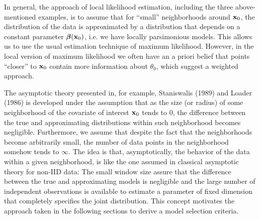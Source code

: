 In general, the approach of local likelihood estimation, including the
three above-mentioned examples, is to assume that 
for ``small'' neighborhoods around ${\mathbf x}_0$, the distribution of
the data is approximated by a distribution that depends on a constant
parameter $\mbox{\boldmath $\beta$\unboldmath}({\mathbf x}_0)$, i.e. we have locally parsimonious models. This
allows us to  
use the usual estimation technique of maximum likelihood. However, in
the local version of maximum likelihood we often
have an a priori belief that points  
``closer'' to ${\mathbf x}_0$ contain more information about
$\theta_0$, which suggest a weighted approach. 

The asymptotic theory presented in, for example,  Staniswalis (1989)
\nocite{stan:1989} and 
Loader (1986) \nocite{load:1996} is developed under the assumption that 
as the size (or radius) of some neighborhood of the covariate of
interest ${\mathbf x}_0$ tends to 0, the difference between the true and
approximating distributions within such neighborhood becomes
negligible. Furthermore, we assume that despite the fact that the
neighborhoods become arbitrarily small, the
number of data points in the neighborhood somehow tends to $\infty$. 
The idea is that, asymptotically, the behavior of the
data within a given neighborhood, is like the  one assumed in
classical asymptotic theory for non-IID data: The small window size
assure that the difference between the true and approximating models is
negligible and the large number of independent observations is
available
to estimate a parameter of fixed dimension that completely specifies
the joint distribution. This concept motivates the
approach taken in the following sections to derive a model selection
criteria. 

